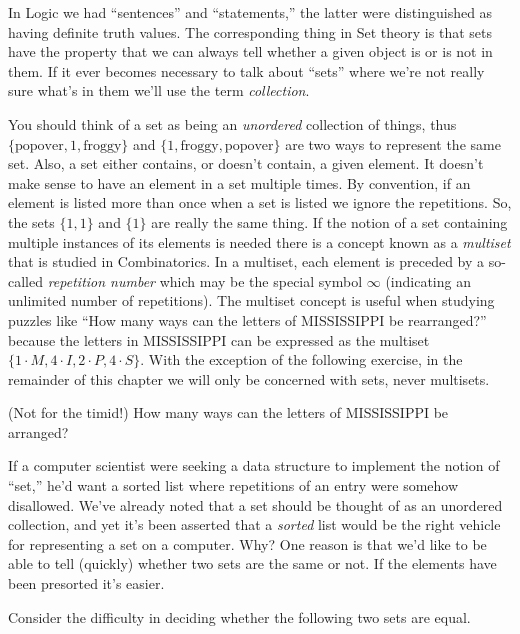 In Logic we had ``sentences'' and ``statements,'' the latter were 
distinguished as having definite truth values.  The corresponding
thing in Set theory is that sets have the property that we can always
tell whether a given object is or is not in them.  If it ever becomes
necessary to talk about ``sets'' where we're not really sure what's in
them we'll use the term \emph{collection}.
  
You should think of a set as being an \emph{unordered} collection of 
things, thus $\{ \mbox{popover}, 1, \mbox{froggy} \}$ and  
$\{ 1, \mbox{froggy}, \mbox{popover} \}$ are two ways to represent the 
same set.  Also, a set either contains, or doesn't contain, a given element.
It doesn't make sense to have an element in a set multiple times.  By
convention, if an element is listed more than once when a set is
listed  we ignore the repetitions.  So, the sets
$\{ 1, 1\}$ and $\{1\}$ are really the same thing.  If the notion
of a set containing multiple instances of its elements is needed there
is a concept known as a 
\emph{multiset} that is studied in Combinatorics.
In a multiset, each element is preceded by a so-called 
\emph{repetition number}
which may be the special symbol $\infty$ (indicating an unlimited number
of repetitions).  The multiset concept is useful when studying puzzles like
``How many ways can the letters of MISSISSIPPI be rearranged?'' because the
letters in MISSISSIPPI can be expressed as the multiset $\{1\cdot M, 4\cdot I,
2\cdot P, 4\cdot S \}$.  With the exception of the following exercise, in the
remainder of this chapter we will only be concerned with sets, never multisets.

\begin{exer}
(Not for the timid!) How many ways can the letters of MISSISSIPPI be arranged?
\end{exer}

If a computer scientist were seeking a data structure to implement the
notion of ``set,'' he'd want a sorted list where repetitions of an entry
were somehow disallowed.  We've already noted that a set should be thought of
as an unordered collection, and yet it's been asserted that a \emph{sorted}
list would be the right vehicle for representing a set on a computer.  Why?
One reason is that we'd like to be able to tell (quickly) whether two sets
are the same or not.  If the elements have been presorted it's easier.

Consider the difficulty in deciding whether the following two sets are
equal.

